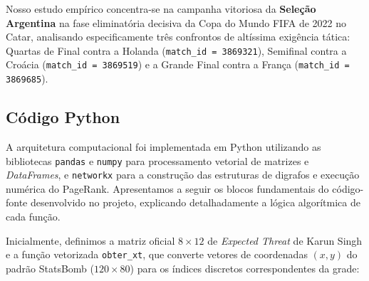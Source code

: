 \documentclass[10pt,a4paper]{article}
\theoremstyle{definition}
\theoremstyle{plain}
\theoremstyle{remark}
\begin{document}
Nosso estudo empírico concentra-se na campanha vitoriosa da \textbf{Seleção Argentina} na fase eliminatória decisiva da Copa do Mundo FIFA de 2022 no Catar, analisando especificamente três confrontos de altíssima exigência tática: Quartas de Final contra a Holanda (\texttt{match\_id = 3869321}), Semifinal contra a Croácia (\texttt{match\_id = 3869519}) e a Grande Final contra a França (\texttt{match\_id = 3869685}).

\subsection{\sffamily Código Python}

A arquitetura computacional foi implementada em Python utilizando as bibliotecas \texttt{pandas} e \texttt{numpy} para processamento vetorial de matrizes e \textit{DataFrames}, e \texttt{networkx} para a construção das estruturas de digrafos e execução numérica do PageRank. Apresentamos a seguir os blocos fundamentais do código-fonte desenvolvido no projeto, explicando detalhadamente a lógica algorítmica de cada função.

Inicialmente, definimos a matriz oficial $8 \times 12$ de \textit{Expected Threat} de Karun Singh \cite{singh2018} e a função vetorizada \texttt{obter\_xt}, que converte vetores de coordenadas $(x, y)$ do padrão StatsBomb ($120 \times 80$) para os índices discretos correspondentes da grade:
\end{document}
